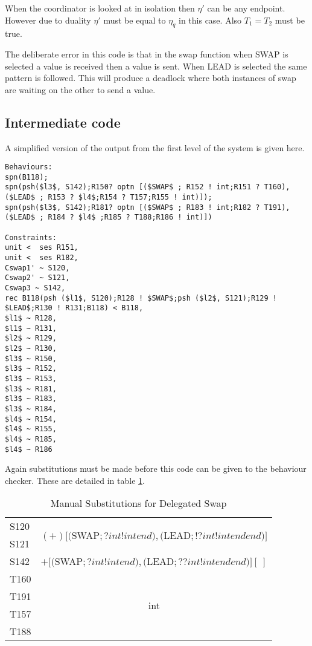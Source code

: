 When the coordinator is looked at in isolation then $\eta'$ can be any endpoint. However due to duality $\eta'$ must be equal to $\eta_q$ in this case. Also $T_1 = T_2$ must be true.

The deliberate error in this code is that in the swap function when SWAP is selected a value is received then a value is sent. When LEAD is selected the same pattern is followed. This will produce a deadlock where both instances of swap are waiting on the other to send a value. 

\subsection{Intermediate code}

A simplified version of the output from the first level of the system is given here. 

\begin{lstlisting}
Behaviours:
spn(B118);
spn(psh($l3$, S142);R150? optn [($SWAP$ ; R152 ! int;R151 ? T160), ($LEAD$ ; R153 ? $l4$;R154 ? T157;R155 ! int)]);
spn(psh($l3$, S142);R181? optn [($SWAP$ ; R183 ! int;R182 ? T191), ($LEAD$ ; R184 ? $l4$ ;R185 ? T188;R186 ! int)])

Constraints:
unit <  ses R151,
unit <  ses R182,
Cswap1' ~ S120,
Cswap2' ~ S121,
Cswap3 ~ S142,
rec B118(psh ($l1$, S120);R128 ! $SWAP$;psh ($l2$, S121);R129 ! $LEAD$;R130 ! R131;B118) < B118,
$l1$ ~ R128,
$l1$ ~ R131,
$l2$ ~ R129,
$l2$ ~ R130,
$l3$ ~ R150,
$l3$ ~ R152,
$l3$ ~ R153,
$l3$ ~ R181,
$l3$ ~ R183,
$l3$ ~ R184,
$l4$ ~ R154,
$l4$ ~ R155,
$l4$ ~ R185,
$l4$ ~ R186
\end{lstlisting}

Again substitutions must be made before this code can be given to the behaviour checker. These are detailed in table \ref{subs2}.

\begin{table}
\centering
\begin{tabular}{l |c}
S120 & \multirow{2}{*}{$(+) [($SWAP$; ? int ! int end ), ($LEAD$; ! ? int ! int end end)]$} \\
S121 & \\ 
S142 & $+ [($SWAP$; ? int ! int end), ($LEAD$; ? ? int ! int end end)] [\ ]$ \\ 
T160 & \multirow{4}{*}{int} \\
T191 & \\ 
T157 & \\
T188 & \\ 
\end{tabular}
\caption{Manual Substitutions for Delegated Swap}
\label{subs2}
\end{table}

